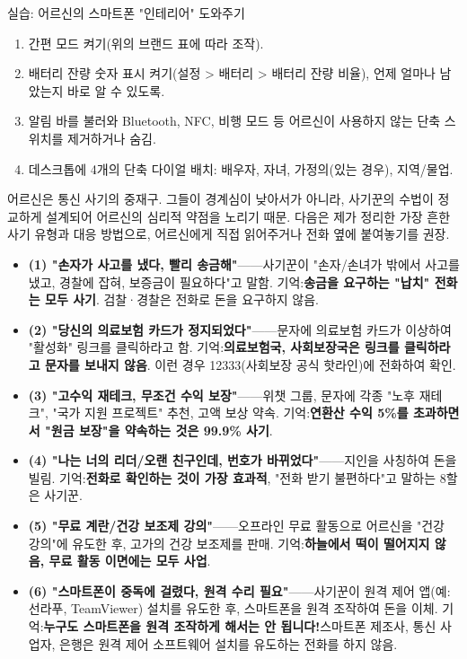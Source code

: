 \begin{tcbpractice}{실습: 어르신의 스마트폰 "인테리어" 도와주기}
\begin{enumerate}
  \item 간편 모드 켜기(위의 브랜드 표에 따라 조작).
  \item 배터리 잔량 숫자 표시 켜기(설정 > 배터리 > 배터리 잔량 비율), 언제 얼마나 남았는지 바로 알 수 있도록.
  \item 알림 바를 불러와 Bluetooth, NFC, 비행 모드 등 어르신이 사용하지 않는 단축 스위치를 제거하거나 숨김.
  \item 데스크톱에 4개의 단축 다이얼 배치: 배우자, 자녀, 가정의(있는 경우), 지역/물업.
\end{enumerate}

\end{tcbpractice}


어르신은 통신 사기의 중재구. 그들이 경계심이 낮아서가 아니라, 사기꾼의 수법이 정교하게 설계되어 어르신의 심리적 약점을 노리기 때문. 다음은 제가 정리한 가장 흔한 사기 유형과 대응 방법으로, 어르신에게 직접 읽어주거나 전화 옆에 붙여놓기를 권장.


\begin{itemize}
  \item \textbf{(1) "손자가 사고를 냈다, 빨리 송금해"}——사기꾼이 "손자/손녀가 밖에서 사고를 냈고, 경찰에 잡혀, 보증금이 필요하다"고 말함. 기억:\textbf{송금을 요구하는 "납치" 전화는 모두 사기}. 검찰·경찰은 전화로 돈을 요구하지 않음.
  \item \textbf{(2) "당신의 의료보험 카드가 정지되었다"}——문자에 의료보험 카드가 이상하여 "활성화" 링크를 클릭하라고 함. 기억:\textbf{의료보험국, 사회보장국은 링크를 클릭하라고 문자를 보내지 않음}. 이런 경우 12333(사회보장 공식 핫라인)에 전화하여 확인.
  \item \textbf{(3) "고수익 재테크, 무조건 수익 보장"}——위챗 그룹, 문자에 각종 "노후 재테크", "국가 지원 프로젝트" 추천, 고액 보상 약속. 기억:\textbf{연환산 수익 5\%를 초과하면서 "원금 보장"을 약속하는 것은 99.9\% 사기}.
  \item \textbf{(4) "나는 너의 리더/오랜 친구인데, 번호가 바뀌었다"}——지인을 사칭하여 돈을 빌림. 기억:\textbf{전화로 확인하는 것이 가장 효과적}, "전화 받기 불편하다"고 말하는 8할은 사기꾼.
  \item \textbf{(5) "무료 계란/건강 보조제 강의"}——오프라인 무료 활동으로 어르신을 "건강 강의"에 유도한 후, 고가의 건강 보조제를 판매. 기억:\textbf{하늘에서 떡이 떨어지지 않음, 무료 활동 이면에는 모두 사업}.
  \item \textbf{(6) "스마트폰이 중독에 걸렸다, 원격 수리 필요"}——사기꾼이 원격 제어 앱(예: 선라푸, TeamViewer) 설치를 유도한 후, 스마트폰을 원격 조작하여 돈을 이체. 기억:\textbf{누구도 스마트폰을 원격 조작하게 해서는 안 됩니다!}스마트폰 제조사, 통신 사업자, 은행은 원격 제어 소프트웨어 설치를 유도하는 전화를 하지 않음.
\end{itemize}


